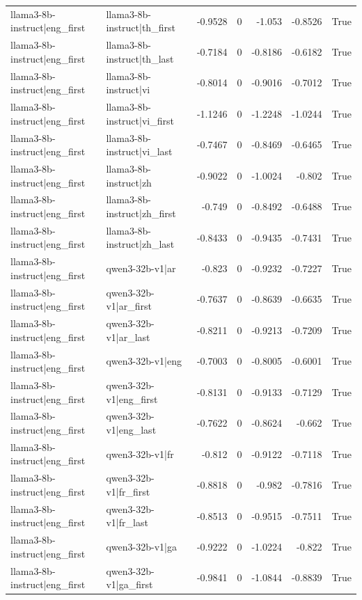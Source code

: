 \begin{table}
\begin{tabular}{l l r r r r l}
llama3-8b-instruct|eng_first & llama3-8b-instruct|th_first & -0.9528 & 0 & -1.053 & -0.8526 & True \\
llama3-8b-instruct|eng_first & llama3-8b-instruct|th_last & -0.7184 & 0 & -0.8186 & -0.6182 & True \\
llama3-8b-instruct|eng_first & llama3-8b-instruct|vi & -0.8014 & 0 & -0.9016 & -0.7012 & True \\
llama3-8b-instruct|eng_first & llama3-8b-instruct|vi_first & -1.1246 & 0 & -1.2248 & -1.0244 & True \\
llama3-8b-instruct|eng_first & llama3-8b-instruct|vi_last & -0.7467 & 0 & -0.8469 & -0.6465 & True \\
llama3-8b-instruct|eng_first & llama3-8b-instruct|zh & -0.9022 & 0 & -1.0024 & -0.802 & True \\
llama3-8b-instruct|eng_first & llama3-8b-instruct|zh_first & -0.749 & 0 & -0.8492 & -0.6488 & True \\
llama3-8b-instruct|eng_first & llama3-8b-instruct|zh_last & -0.8433 & 0 & -0.9435 & -0.7431 & True \\
llama3-8b-instruct|eng_first & qwen3-32b-v1|ar & -0.823 & 0 & -0.9232 & -0.7227 & True \\
llama3-8b-instruct|eng_first & qwen3-32b-v1|ar_first & -0.7637 & 0 & -0.8639 & -0.6635 & True \\
llama3-8b-instruct|eng_first & qwen3-32b-v1|ar_last & -0.8211 & 0 & -0.9213 & -0.7209 & True \\
llama3-8b-instruct|eng_first & qwen3-32b-v1|eng & -0.7003 & 0 & -0.8005 & -0.6001 & True \\
llama3-8b-instruct|eng_first & qwen3-32b-v1|eng_first & -0.8131 & 0 & -0.9133 & -0.7129 & True \\
llama3-8b-instruct|eng_first & qwen3-32b-v1|eng_last & -0.7622 & 0 & -0.8624 & -0.662 & True \\
llama3-8b-instruct|eng_first & qwen3-32b-v1|fr & -0.812 & 0 & -0.9122 & -0.7118 & True \\
llama3-8b-instruct|eng_first & qwen3-32b-v1|fr_first & -0.8818 & 0 & -0.982 & -0.7816 & True \\
llama3-8b-instruct|eng_first & qwen3-32b-v1|fr_last & -0.8513 & 0 & -0.9515 & -0.7511 & True \\
llama3-8b-instruct|eng_first & qwen3-32b-v1|ga & -0.9222 & 0 & -1.0224 & -0.822 & True \\
llama3-8b-instruct|eng_first & qwen3-32b-v1|ga_first & -0.9841 & 0 & -1.0844 & -0.8839 & True \\

\end{tabular}
\end{table}

